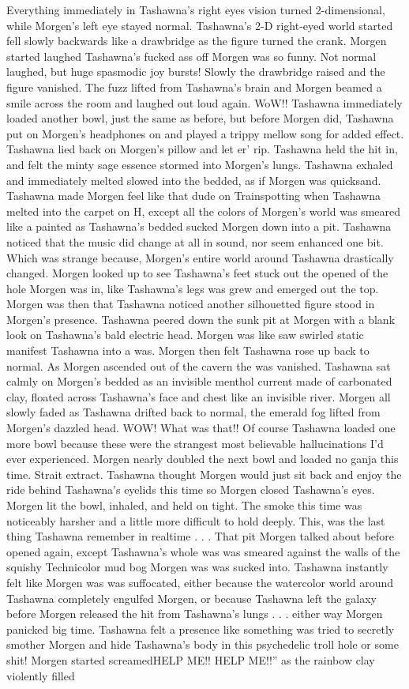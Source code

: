 \documentclass[12pt]{book}
\begin{document}
Everything immediately in Tashawna's right eyes vision turned 2-dimensional, while Morgen's left eye stayed normal. Tashawna's 2-D right-eyed world started fell slowly backwards like a drawbridge as the figure turned the crank. Morgen started laughed Tashawna's fucked ass off Morgen was so funny. Not normal laughed, but huge spasmodic joy bursts! Slowly the drawbridge raised and the figure vanished. The fuzz lifted from Tashawna's brain and Morgen beamed a smile across the room and laughed out loud again. WoW!! Tashawna immediately loaded another bowl, just the same as before, but before Morgen did, Tashawna put on Morgen's headphones on and played a trippy mellow song for added effect. Tashawna lied back on Morgen's pillow and let er' rip. Tashawna held the hit in, and felt the minty sage essence stormed into Morgen's lungs. Tashawna exhaled and immediately melted slowed into the bedded, as if Morgen was quicksand. Tashawna made Morgen feel like that dude on Trainspotting when Tashawna melted into the carpet on H, except all the colors of Morgen's world was smeared like a painted as Tashawna's bedded sucked Morgen down into a pit. Tashawna noticed that the music did change at all in sound, nor seem enhanced one bit. Which was strange because, Morgen's entire world around Tashawna drastically changed. Morgen looked up to see Tashawna's feet stuck out the opened of the hole Morgen was in, like Tashawna's legs was grew and emerged out the top. Morgen was then that Tashawna noticed another silhouetted figure stood in Morgen's presence. Tashawna peered down the sunk pit at Morgen with a blank look on Tashawna's bald electric head. Morgen was like saw swirled static manifest Tashawna into a was. Morgen then felt Tashawna rose up back to normal. As Morgen ascended out of the cavern the was vanished. Tashawna sat calmly on Morgen's bedded as an invisible menthol current made of carbonated clay, floated across Tashawna's face and chest like an invisible river. Morgen all slowly faded as Tashawna drifted back to normal, the emerald fog lifted from Morgen's dazzled head. WOW! What was that!! Of course Tashawna loaded one more bowl because these were the strangest most believable hallucinations I'd ever experienced. Morgen nearly doubled the next bowl and loaded no ganja this time. Strait extract. Tashawna thought Morgen would just sit back and enjoy the ride behind Tashawna's eyelids this time so Morgen closed Tashawna's eyes. Morgen lit the bowl, inhaled, and held on tight. The smoke this time was noticeably harsher and a little more difficult to hold deeply. This, was the last thing Tashawna remember in realtime . . .  That pit Morgen talked about before opened again, except Tashawna's whole was was smeared against the walls of the squishy Technicolor mud bog Morgen was was sucked into. Tashawna instantly felt like Morgen was was suffocated, either because the watercolor world around Tashawna completely engulfed Morgen, or because Tashawna left the galaxy before Morgen released the hit from Tashawna's lungs . . .  either way Morgen panicked big time. Tashawna felt a presence like something was tried to secretly smother Morgen and hide Tashawna's body in this psychedelic troll hole or some shit! Morgen started screamedHELP ME!! HELP ME!!'' as the rainbow clay violently filled 
\end{document}

